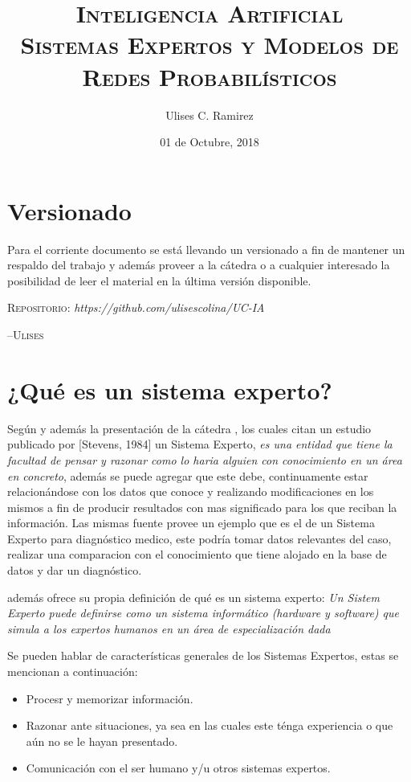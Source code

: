 \documentclass{article}
\title{\textsc{Inteligencia Artificial\\Sistemas Expertos y Modelos de Redes
Probabil\'isticos}}
\author{Ulises C. Ramirez}
\date{01 de Octubre, 2018}
\begin{document}
\maketitle
{}
\newpage
\section*{Versionado}
Para el corriente documento se est\'a llevando un versionado a fin de mantener
un respaldo del trabajo y adem\'as proveer a la c\'atedra o a cualquier interesado
la posibilidad de leer el material en la \'ultima versi\'on disponible.\\

\begin{center}
  \textsc{Repositorio}: \textit{https://github.com/ulisescolina/UC-IA}
\end{center}

\hfill--\textsc{Ulises}

\tableofcontents
{}
\newpage

\section{¿Qu\'e es un sistema experto?}
\label{sec:sysex}
Seg\'un \cite{castillo} y adem\'as la presentaci\'on de la c\'atedra
\cite{iase2018}, los cuales citan un estudio publicado por [Stevens, 1984]
un Sistema Experto, \textit{es una entidad que tiene la
facultad de pensar y razonar como lo haria alguien con conocimiento en un
\'area en concreto}, adem\'as se puede agregar que este debe, continuamente
estar relacion\'andose con los datos que conoce y realizando
modificaciones en los mismos a fin de producir resultados con mas significado
para los que reciban la informaci\'on. Las mismas fuente provee un ejemplo que es el de un Sistema
Experto para diagn\'ostico medico, este podr\'ia tomar datos relevantes del
caso, realizar una comparacion con el conocimiento que tiene alojado en la base
de datos y dar un diagn\'ostico.

\cite{castillo} adem\'as ofrece su propia definici\'on de qu\'e es un sistema
experto: \textit{Un Sistem Experto puede definirse como un sistema
inform\'atico (hardware y software) que simula a los expertos humanos en un
\'area de especializaci\'on dada}

Se pueden hablar de caracter\'isticas generales de los Sistemas Expertos, estas
se mencionan a continuaci\'on:
\begin{itemize}
\item Procesr y memorizar informaci\'on.
\item Razonar ante situaciones, ya sea en las cuales este t\'enga experiencia o
que a\'un no se le hayan presentado.
\item Comunicaci\'on con el ser humano y/u otros sistemas expertos.
\end{itemize}
\end{document}
